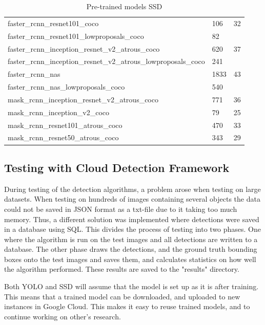 \begin{table}[h!]
\begin{tabular}{lll}
faster\_rcnn\_resnet101\_coco                                   & 106         & 32                                \\
faster\_rcnn\_resnet101\_lowproposals\_coco                     & 82          &                                   \\
faster\_rcnn\_inception\_resnet\_v2\_atrous\_coco               & 620         & 37                                \\
faster\_rcnn\_inception\_resnet\_v2\_atrous\_lowproposals\_coco & 241         &                                   \\
faster\_rcnn\_nas                                               & 1833        & 43                                \\
faster\_rcnn\_nas\_lowproposals\_coco                           & 540         &                                   \\
mask\_rcnn\_inception\_resnet\_v2\_atrous\_coco                 & 771         & 36                                \\
mask\_rcnn\_inception\_v2\_coco                                 & 79          & 25                                \\
mask\_rcnn\_resnet101\_atrous\_coco                             & 470         & 33                                \\
mask\_rcnn\_resnet50\_atrous\_coco                              & 343         & 29                               
\end{tabular}
\caption{Pre-trained models SSD}
\label{ssd_tab}
\end{table}


\newpage

\subsection{Testing with Cloud Detection Framework}
During testing of the detection algorithms, a problem arose when testing on large datasets. When testing on hundreds of images containing several objects the data could not be saved in JSON format as a txt-file due to it taking too much memory. Thus, a different solution was implemented where detections were saved in a database using SQL. This divides the process of testing into two phases. One where the algorithm is run on the test images and all detections are written to a database. The other phase draws the detections, and the ground truth bounding boxes onto the test images and saves them, and calculates statistics on how well the algorithm performed. These results are saved to the "results" directory.

\vspace{3mm}

Both YOLO and SSD will assume that the model is set up as it is after training. This means that a trained model can be downloaded, and uploaded to new instances in Google Cloud. This makes it easy to reuse trained models, and to continue working on other's research.









\cleardoublepage